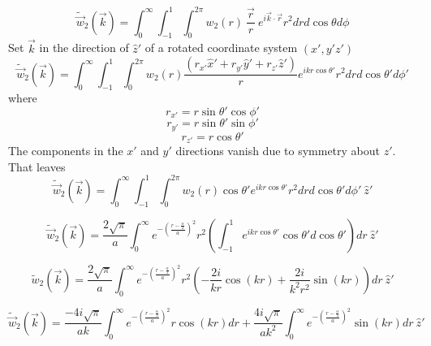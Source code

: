 \documentclass[double,12pt]{beavtex}
\begin{document}
\begin{equation}{\widetilde{\vec{w}}_2(\vec{k})=\int_{0}^{\infty}\int_{-1}^{1}\int_{0}^{2\pi}w_2(r){~}\frac{\vec{r}}{r}{~}e^{i\vec{k}\cdot{\vec{r}}}r^2d{r}d{\cos\theta}d{\phi}}\end{equation}
Set $\vec{k}$ in the direction of $\hat{z}'$ of a rotated coordinate 
system $(x',y'z')$ 
\begin{equation}{\widetilde{\vec{w}}_2(\vec{k})=\int_{0}^{\infty}\int_{-1}^{1}\int_{0}^{2\pi}w_2(r)\frac{(r_{x'}\hat{x}'+r_{y'}\hat{y}'+r_{z'}\hat{z}')}{r}e^{ikr\cos\theta'}r^2d{r}d{\cos\theta'}d{\phi'}}\end{equation}
where 
\begin{displaymath}{r_{x'}=r\sin\theta'\cos\phi'}\end{displaymath}
\begin{displaymath}{r_{y'}=r\sin\theta'\sin\phi'}\end{displaymath}
\begin{displaymath}{r_{z'}=r\cos\theta'}\end{displaymath} 
The components in the $x'$ and $y'$ directions vanish due to symmetry 
about $z'$. That leaves
\begin{equation}{\widetilde{\vec{w}}_2(\vec{k})=\int_{0}^{\infty}\int_{-1}^{1}\int_{0}^{2\pi}w_2(r)\cos{\theta}'e^{ikr\cos\theta'}r^2d{r}d{\cos\theta'}d{\phi'}{~}\hat{z}'}\end{equation}

\begin{equation}{\widetilde{\vec{w}}_2(\vec{k})=\frac{2\sqrt{\pi}}{a}\int_{0}^{\infty}e^{-\left(\frac{r-\frac{\alpha}{2}}{a}\right)^2}r^2\left(\int_{-1}^{1}e^{ikr\cos\theta'}\cos{\theta}'d{\cos\theta'}\right)d{r}{~}\hat{z}'}\end{equation}

\begin{equation}{\widetilde{w}_2(\vec{k})=\frac{2\sqrt{\pi}}{a}\int_{0}^{\infty}e^{-\left(\frac{r-\frac{\alpha}{2}}{a}\right)^2}r^2\left(-\frac{2i}{kr}\cos(kr) + \frac{2i}{k^2r^2}\sin(kr)\right)d{r}{~}\hat{z}'}\end{equation}

\begin{equation}{\widetilde{\vec{w}}_2(\vec{k})=\frac{-4i\sqrt{\pi}}{ak}\int_{0}^{\infty}e^{-\left(\frac{r-\frac{\alpha}{2}}{a}\right)^2}r\cos(kr)d{r} + \frac{4i\sqrt{\pi}}{ak^2}\int_{0}^{\infty}e^{-\left(\frac{r-\frac{\alpha}{2}}{a}\right)^2}\sin(kr)d{r}{~}\hat{z}'}\end{equation}
\end{document}
